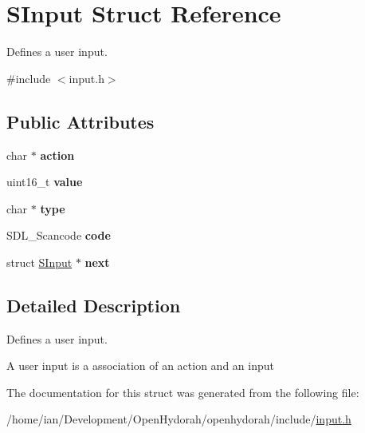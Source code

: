 \hypertarget{structSInput}{\section{S\-Input Struct Reference}
\label{structSInput}
}


Defines a user input.  




{\ttfamily \#include $<$input.\-h$>$}

\subsection*{Public Attributes}
\begin{DoxyCompactItemize}
\item 
\hypertarget{structSInput_a8e372877e888af21e41726c3158acc24}{char $\ast$ {\bfseries action}}\label{structSInput_a8e372877e888af21e41726c3158acc24}

\item 
\hypertarget{structSInput_aa54b64e2ed0eba6f66fe5fc89f040d56}{uint16\-\_\-t {\bfseries value}}\label{structSInput_aa54b64e2ed0eba6f66fe5fc89f040d56}

\item 
\hypertarget{structSInput_a9a44d58bded9c6acb38e7519795da8dd}{char $\ast$ {\bfseries type}}\label{structSInput_a9a44d58bded9c6acb38e7519795da8dd}

\item 
\hypertarget{structSInput_adca64db03348bd440f8d7f6e02eb558a}{S\-D\-L\-\_\-\-Scancode {\bfseries code}}\label{structSInput_adca64db03348bd440f8d7f6e02eb558a}

\item 
\hypertarget{structSInput_ac453dc44e454a2a439fefa723b99971e}{struct \hyperlink{structSInput}{S\-Input} $\ast$ {\bfseries next}}\label{structSInput_ac453dc44e454a2a439fefa723b99971e}

\end{DoxyCompactItemize}


\subsection{Detailed Description}
Defines a user input. 

A user input is a association of an action and an input 

The documentation for this struct was generated from the following file\-:\begin{DoxyCompactItemize}
\item 
/home/ian/\-Development/\-Open\-Hydorah/openhydorah/include/\hyperlink{input_8h}{input.\-h}\end{DoxyCompactItemize}
